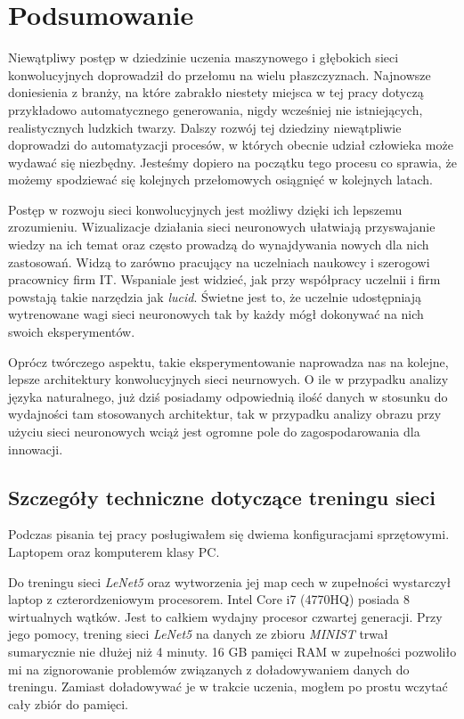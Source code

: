 \chapter{Podsumowanie}
\label{chap:summary}

Niewątpliwy postęp w dziedzinie uczenia maszynowego i głębokich sieci konwolucyjnych doprowadził do przełomu na wielu płaszczyznach. Najnowsze doniesienia z branży, na które zabrakło niestety miejsca w tej pracy dotyczą przykładowo automatycznego generowania, nigdy wcześniej nie istniejących, realistycznych ludzkich twarzy.
Dalszy rozwój tej dziedziny niewątpliwie doprowadzi do automatyzacji procesów, w których obecnie udział człowieka może wydawać się niezbędny. Jesteśmy dopiero na początku tego procesu co sprawia, że możemy spodziewać się kolejnych przełomowych osiągnięć w kolejnych latach.

Postęp w rozwoju sieci konwolucyjnych jest możliwy dzięki ich lepszemu zrozumieniu. Wizualizacje działania sieci neuronowych ułatwiają przyswajanie wiedzy na ich temat oraz często prowadzą do wynajdywania nowych dla nich zastosowań. Widzą to zarówno pracujący na uczelniach naukowcy i szerogowi pracownicy firm IT. Wspaniale jest widzieć, jak przy współpracy uczelnii i firm powstają takie narzędzia jak \textit{lucid}. Świetne jest to, że uczelnie udostępniają wytrenowane
wagi sieci neuronowych tak by każdy mógł dokonywać na nich swoich eksperymentów.

Oprócz twórczego aspektu, takie eksperymentowanie naprowadza nas na kolejne, lepsze architektury konwolucyjnych sieci neurnowych. O ile w przypadku analizy języka naturalnego, już dziś posiadamy odpowiednią ilość danych w stosunku do wydajności tam stosowanych architektur, tak w przypadku analizy obrazu przy użyciu sieci neuronowych wciąż jest ogromne pole do zagospodarowania dla innowacji.

\section{Szczegóły techniczne dotyczące treningu sieci}
Podczas pisania tej pracy posługiwałem się dwiema konfiguracjami sprzętowymi. Laptopem oraz komputerem klasy PC.

Do treningu sieci \textit{LeNet5} oraz wytworzenia jej map cech w zupełności wystarczył laptop z czterordzeniowym procesorem.
Intel Core i7 (4770HQ) posiada 8 wirtualnych wątków. Jest to całkiem wydajny procesor czwartej generacji. 
Przy jego pomocy, trening sieci \textit{LeNet5} na danych ze zbioru \textit{MINIST} trwał sumarycznie nie dłużej niż 4 minuty. 16 GB pamięci RAM w zupełności pozwoliło mi na zignorowanie problemów związanych z doładowywaniem danych do treningu. Zamiast doładowywać je w trakcie uczenia, mogłem po prostu wczytać cały zbiór do pamięci. 

